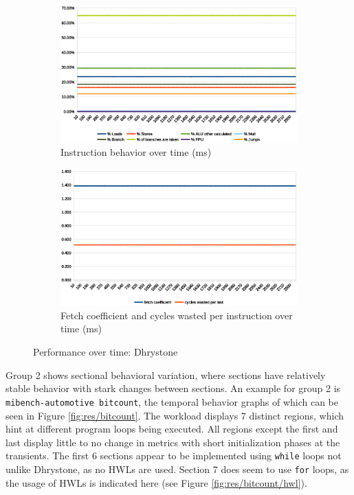 \documentclass[../bachelor_paper.tex]{subfiles}
\begin{document}
\begin{figure}
    \begin{subfigure}{0.45\textwidth}
        \includegraphics[width=\textwidth]{img/graph/riscv/dhrystone_inst.eps}
        \caption{Instruction behavior over time (ms)}
        \label{fig:res/dhrystone/inst}
    \end{subfigure}
    \begin{subfigure}{0.45\textwidth}
        \includegraphics[width=\textwidth]{img/graph/riscv/dhrystone_fetch_waste.eps}
        \caption{Fetch coefficient and cycles wasted per instruction over time (ms)}
        \label{fig:res/dhrystone/fetch_waste}
    \end{subfigure}
    \caption{Performance over time: Dhrystone}
    \label{fig:res/dhrystone}
\end{figure}

Group 2 shows sectional behavioral variation, where sections have relatively stable behavior with stark changes between sections. An example for group 2 is \texttt{mibench-automotive bitcount}, the temporal behavior graphs of which can be seen in Figure \ref{fig:res/bitcount}. The workload displays 7 distinct regions, which hint at different program loops being executed. All regions except the first and last display little to no change in metrics with short initialization phases at the transients. The first 6 sections appear to be implemented using \texttt{while} loops not unlike Dhrystone, as no \acp{HWL} are used. Section 7 does seem to use \texttt{for} loops, as the usage of \acp{HWL} is indicated here (see Figure \ref{fig:res/bitcount/hwl}).
\end{document}
